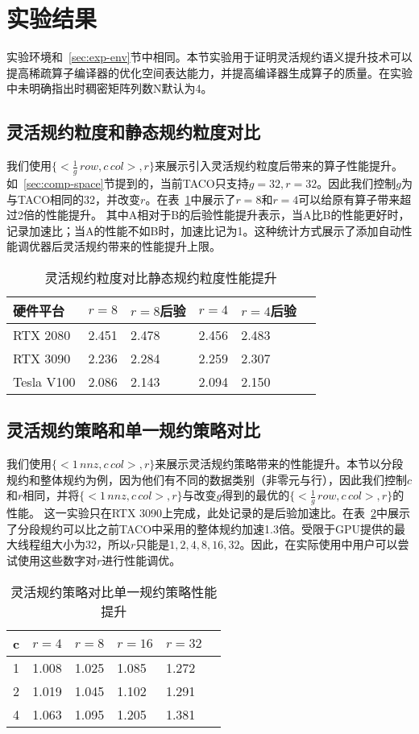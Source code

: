 \section{实验结果}
实验环境和~\ref{sec:exp-env}节中相同。本节实验用于证明灵活规约语义提升技术可以提高稀疏算子编译器的优化空间表达能力，并提高编译器生成算子的质量。在实验中未明确指出时稠密矩阵列数N默认为4。
\subsection{灵活规约粒度和静态规约粒度对比}
我们使用$\{<\frac{1}{g}\,row, c\,col>,r\}$来展示引入灵活规约粒度后带来的算子性能提升。如~\ref{sec:comp-space}节提到的，当前TACO只支持$g=32, r=32$。因此我们控制$g$为与TACO相同的32，并改变$r$。在表~\ref{tab:comp-flexgra}中展示了$r=8$和$r=4$可以给原有算子带来超过2倍的性能提升。
其中A相对于B的后验性能提升表示，当A比B的性能更好时，记录加速比；当A的性能不如B时，加速比记为1。这种统计方式展示了添加自动性能调优器后灵活规约带来的性能提升上限。
\begin{table}
  \centering
  \caption{灵活规约粒度对比静态规约粒度性能提升}
  \begin{tabular}{llllll}
  \toprule
  硬件平台 &  $r=8$  & $r=8$后验 & $r=4$  & $r=4$后验\\
  \midrule
  RTX 2080    & 2.451   & 2.478 & 2.456 & 2.483 \\
  RTX 3090    & 2.236   & 2.284  & 2.259 & 2.307 \\
  Tesla V100    & 2.086  & 2.143  & 2.094 & 2.150 \\
  \bottomrule
  \end{tabular}
  \label{tab:comp-flexgra}
\end{table}
\subsection{灵活规约策略和单一规约策略对比}
我们使用$\{<1\,nnz , c\,col>,r\}$来展示灵活规约策略带来的性能提升。本节以分段规约和整体规约为例，因为他们有不同的数据类别（非零元与行），因此我们控制$c$和$r$相同，并将$\{<1\,nnz , c\,col>,r\}$与改变$g$得到的最优的$\{<\frac{1}{g}\,row, c\,col>,r\}$的性能。
这一实验只在RTX 3090上完成，此处记录的是后验加速比。在表~\ref{tab:comp-flexstr}中展示了分段规约可以比之前TACO中采用的整体规约加速1.3倍。受限于GPU提供的最大线程组大小为32，所以$r$只能是$1,2,4,8,16,32$。因此，在实际使用中用户可以尝试使用这些数字对$r$进行性能调优。
\begin{table}
  \centering
  \caption{灵活规约策略对比单一规约策略性能提升}
  \begin{tabular}{llllll}
  \toprule
  c &  $r=4$  & $r=8$ & $r=16$  & $r=32$\\
  \midrule
  1   & 1.008   & 1.025  & 1.085 & 1.272 \\
  2    & 1.019   & 1.045  & 1.102 & 1.291 \\
  4   & 1.063   & 1.095  & 1.205 & 1.381 \\
  \bottomrule
  \end{tabular}
  \label{tab:comp-flexstr}
\end{table}
